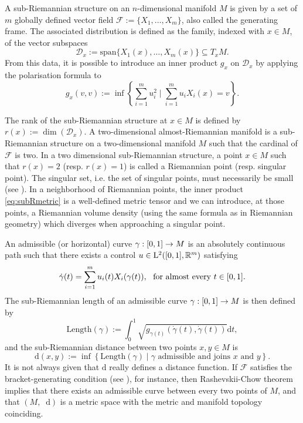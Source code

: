 \documentclass[11pt,twoside,a4paper]{article}
\newcommand*\diff{\mathop{}\!\mathrm{d}}
\newcommand{\R}{\mathbb{R}}
\theoremstyle{theorem}
\theoremstyle{definition}
\theoremstyle{remark}
\theoremstyle{proof}
\begin{document}
A sub-Riemannian structure on an $n$-dimensional manifold $M$ is given by a set of $m$ globally defined vector field $\mathcal{F} := \{X_1, \dots, X_m\}$, also called the generating frame. The associated distribution is defined as the family, indexed with $x \in M$, of the vector subspaces
\[
\mathcal{D}_x := \mathrm{span} \{X_1(x), \dots, X_m(x)\} \subseteq T_xM.
\]
From this data, it is possible to introduce an inner product $g_x$ on $\mathcal{D}_x$ by applying the polarisation formula to
\begin{equation}
    \label{eq:subRmetric}
    g_x(v, v) := \inf \left\{ \sum_{i = 1}^m u_i^2 \mid \sum_{i = 1}^m u_i X_i(x) = v  \right\}.
\end{equation}

The rank of the sub-Riemannian structure at $x \in M$ is defined by $r(x) := \dim (\mathcal{D}_x)$. A two-dimensional almost-Riemannian manifold is a sub-Riemannian structure on a two-dimensional manifold $M$ such that the cardinal of $\mathcal{F}$ is two.
In a two dimensional sub-Riemannian structure, a point $x \in M$ such that $r(x) = 2$ (resp. $r(x) = 1$) is called a Riemannian point (resp. singular point). The singular set, i.e. the set of singular points, must necessarily be small (see \cite[Section 9.1.1]{ABB-srgeom}). In a neighborhood of Riemannian points,
the inner product \cref{eq:subRmetric} is a well-defined metric tensor and we can introduce, at those points, a Riemannian volume density (using the same formula as in Riemannian geometry) which diverges when approaching a singular point.

An admissible (or horizontal) curve $\gamma : \interval{0}{1} \to M$ is an absolutely continuous path such that there exists a control $u \in \mathrm{L}^2(\interval{0}{1}, \R^m)$ satisfying
\[
\dot{\gamma}(t) = \sum_{i = 1}^m u_i(t) X_i(\gamma(t)), \ \text{ for almost every } t \in \interval{0}{1}.
\]
The sub-Riemannian length of an admissible curve $\gamma : \interval{0}{1} \to M$ is then defined by
\[
\mathrm{Length}(\gamma) := \int_0^1 \sqrt{g_{\gamma(t)}(\dot{\gamma}(t), \dot{\gamma}(t))} \mathrm{d}t,
\]
and the sub-Riemannian distance between two points $x, y \in M$ is
\begin{equation}\label{e:distance}
\mathrm{d}(x, y) := \inf \left\{ \mathrm{Length}(\gamma) \mid \gamma \text{ admissible and joins } x \text{ and } y \right\}.
\end{equation}
It is not always given that $\mathrm{d}$ really defines a distance function. If $\mathcal{F}$ satisfies the bracket-generating condition (see \cite[Definition 3.1]{ABB-srgeom}), for instance, then Rashevskii-Chow theorem \cite[Section 3.2]{ABB-srgeom} implies that there exists an admissible curve between every two points of $M$, and that $(M, \diff)$ is a metric space with the metric and manifold topology coinciding.
\end{document}
